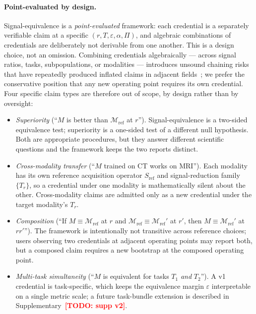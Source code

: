 \documentclass[twoside,11pt]{article}
\newcommand{\todo}[1]{\textcolor{red}{\textbf{[TODO: #1]}}}
\newcommand{\Mref}{\mathcal{M}_{\textrm{ref}}}
\newcommand{\Sref}{S_{\textrm{ref}}}
\begin{document}
\paragraph{Point-evaluated by design.} Signal-equivalence is a \emph{point-evaluated} framework: each credential is a separately verifiable claim at a specific $(r, T, \varepsilon, \alpha, \Pi)$, and algebraic combinations of credentials are deliberately not derivable from one another. This is a design choice, not an omission. Combining credentials algebraically --- across signal ratios, tasks, subpopulations, or modalities --- introduces unsound chaining risks that have repeatedly produced inflated claims in adjacent fields~\citep{wang2020deeplearningreview}; we prefer the conservative position that any new operating point requires its own credential. Four specific claim types are therefore out of scope, by design rather than by oversight:

\begin{itemize}
    \item \textit{Superiority} (``$M$ is better than $\Mref$ at $r$''). Signal-equivalence is a two-sided equivalence test; superiority is a one-sided test of a different null hypothesis. Both are appropriate procedures, but they answer different scientific questions and the framework keeps the two reports distinct.
    \item \textit{Cross-modality transfer} (``$M$ trained on CT works on MRI''). Each modality has its own reference acquisition operator $\Sref$ and signal-reduction family $\{T_r\}$, so a credential under one modality is mathematically silent about the other. Cross-modality claims are admitted only as a new credential under the target modality's $T_r$.
    \item \textit{Composition} (``If $M \equiv \Mref$ at $r$ and $\Mref \equiv \Mref'$ at $r'$, then $M \equiv \Mref'$ at $r r'$''). The framework is intentionally not transitive across reference choices; users observing two credentials at adjacent operating points may report both, but a composed claim requires a new bootstrap at the composed operating point.
    \item \textit{Multi-task simultaneity} (``$M$ is equivalent for tasks $T_1$ \emph{and} $T_2$''). A v1 credential is task-specific, which keeps the equivalence margin $\varepsilon$ interpretable on a single metric scale; a future task-bundle extension is described in Supplementary~\todo{supp v2}.
\end{itemize}
\end{document}
